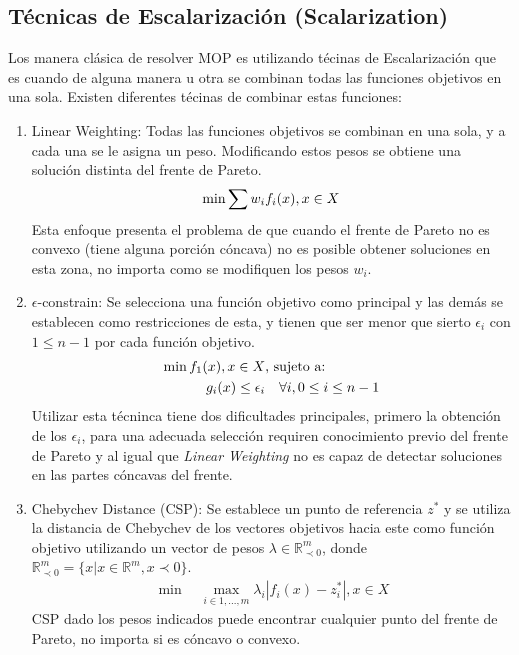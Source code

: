 \subsection{T\'ecnicas de Escalarizaci\'on (Scalarization)}
Los manera cl\'asica de resolver MOP es utilizando t\'ecinas de Escalarizaci\'on que es cuando de alguna manera u otra se combinan todas las funciones objetivos en una sola. Existen diferentes t\'ecinas de combinar estas funciones:
\begin{enumerate}
    \item Linear Weighting: Todas las funciones objetivos se combinan en una sola, y a cada una se le asigna un peso. Modificando estos pesos se obtiene una soluci\'on distinta del frente de Pareto.\\
    \begin{align*}
        \min \sum w_i f_i(x), \space x \in X
    \end{align*}
    Esta enfoque presenta el problema de que cuando el frente de Pareto no es convexo (tiene alguna porci\'on c\'oncava) no es posible obtener soluciones en esta zona, no importa como se modifiquen los pesos $w_i$.

    \item $\epsilon$-constrain: Se selecciona una funci\'on objetivo como principal y las dem\'as se establecen como restricciones de esta, y tienen que ser menor que sierto $\epsilon_i$ con $1 \leq n - 1$ por cada funci\'on objetivo.
    \begin{align*}
            \min  f_1(x), \space x \in X  & \text{, sujeto a:}   \\
            g_i(x) \leq \epsilon_i & \quad  \forall i, 0 \leq i \leq n - 1
    \end{align*}
    Utilizar esta t\'ecninca tiene dos dificultades principales, primero la obtenci\'on de los $\epsilon_i$, para una adecuada selecci\'on requiren conocimiento previo del frente de Pareto y al igual que \textit{Linear Weighting} no es capaz de detectar soluciones en las partes c\'oncavas del frente.

\item Chebychev Distance (CSP): Se establece un punto de referencia $z^*$ y se utiliza la distancia de Chebychev de los vectores objetivos hacia este como funci\'on objetivo utilizando un vector de pesos $\lambda \in \mathbb{R}^m_{\prec 0}$, donde $\mathbb{R}^m_{\prec 0} = \{x | x \in \mathbb{R}^m, x \prec 0 \}$. 
    \begin{align*}
        \min \quad \max_{i \in {1,...,m}} \lambda_i |f_i(x) - z^*_i|, x \in X 
    \end{align*}
    CSP dado los pesos indicados puede encontrar cualquier punto del frente de Pareto, no importa si es c\'oncavo o convexo.

\end{enumerate}

